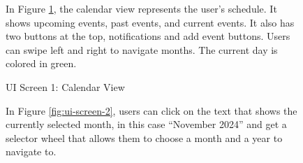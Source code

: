 \begin{figure}[!h]
\begin{minipage}{0.3\textwidth}
        \caption{UI Screen 1: Calendar View}
        \label{fig:ui-screen-1}
    \end{minipage}
    \hfill
    \begin{minipage}{0.65\textwidth}
        In Figure \ref{fig:ui-screen-1}, the calendar view represents the user's schedule. It shows upcoming events, past events, and current events. It also has two buttons at the top, notifications and add event buttons. Users can swipe left and right to navigate months. The current day is colored in green.
    \end{minipage}
\end{figure}

\begin{figure}[!h]
    \begin{minipage}{0.65\textwidth}
        In Figure \ref{fig:ui-screen-2}, users can click on the text that shows the currently selected month, in this case ``November 2024'' and get a selector wheel that allows them to choose a month and a year to navigate to.
    \end{minipage}
    \hfill
    \begin{minipage}{0.3\textwidth}
        \centering

\end{minipage}
\end{figure}
